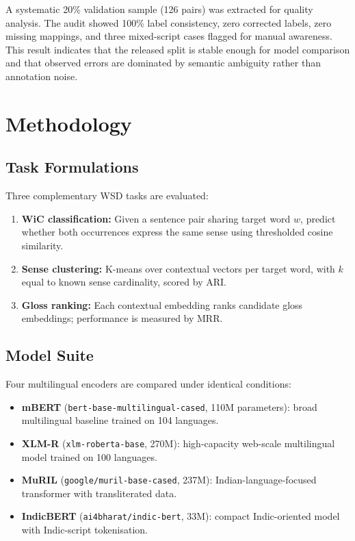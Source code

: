 \documentclass[conference]{IEEEtran}
\begin{document}
A systematic 20\% validation sample (126 pairs) was extracted for
quality analysis.
The audit showed 100\% label consistency, zero corrected labels, zero missing
mappings, and three mixed-script cases flagged for manual awareness.
This result indicates that the released split is stable enough for model
comparison and that observed errors are dominated by semantic ambiguity rather
than annotation noise.

\section{Methodology}

\subsection{Task Formulations}

Three complementary WSD tasks are evaluated:
\begin{enumerate}
  \item \textbf{WiC classification:} Given a sentence pair sharing target word
        $w$, predict whether both occurrences express the same sense using
        thresholded cosine similarity.
  \item \textbf{Sense clustering:} K-means over contextual vectors per target
        word, with $k$ equal to known sense cardinality, scored by ARI.
  \item \textbf{Gloss ranking:} Each contextual embedding ranks candidate gloss
        embeddings; performance is measured by MRR.
\end{enumerate}

\subsection{Model Suite}

Four multilingual encoders are compared under identical conditions:
\begin{itemize}
  \item \textbf{mBERT} (\texttt{bert-base-multilingual-cased}, 110M parameters):
        broad multilingual baseline trained on 104 languages.
  \item \textbf{XLM-R} (\texttt{xlm-roberta-base}, 270M): high-capacity
        web-scale multilingual model trained on 100 languages.
  \item \textbf{MuRIL} (\texttt{google/muril-base-cased}, 237M):
        Indian-language-focused transformer with transliterated data.
  \item \textbf{IndicBERT} (\texttt{ai4bharat/indic-bert}, 33M):
        compact Indic-oriented model with Indic-script tokenisation.
\end{itemize}
\end{document}
